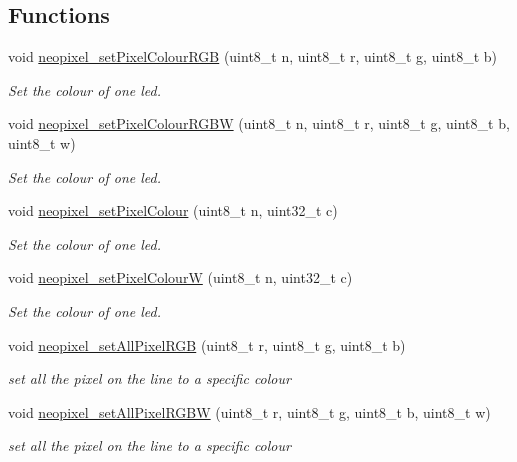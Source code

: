 \subsection*{Functions}
\begin{DoxyCompactItemize}
\item 
void \hyperlink{group___neo_pixel___display_ga63c196a71ffb007411929e41ba5df41d}{neopixel\+\_\+set\+Pixel\+Colour\+R\+GB} (uint8\+\_\+t n, uint8\+\_\+t r, uint8\+\_\+t g, uint8\+\_\+t b)
\begin{DoxyCompactList}\small\item\em Set the colour of one led. \end{DoxyCompactList}\item 
void \hyperlink{group___neo_pixel___display_ga58d5ceb79029ca8dc5dd8b27b65e4f09}{neopixel\+\_\+set\+Pixel\+Colour\+R\+G\+BW} (uint8\+\_\+t n, uint8\+\_\+t r, uint8\+\_\+t g, uint8\+\_\+t b, uint8\+\_\+t w)
\begin{DoxyCompactList}\small\item\em Set the colour of one led. \end{DoxyCompactList}\item 
void \hyperlink{group___neo_pixel___display_gaecbdecac1da356c5fba07058983d9066}{neopixel\+\_\+set\+Pixel\+Colour} (uint8\+\_\+t n, uint32\+\_\+t c)
\begin{DoxyCompactList}\small\item\em Set the colour of one led. \end{DoxyCompactList}\item 
void \hyperlink{group___neo_pixel___display_ga4daf6edfe83394f425ec51f64d92c49c}{neopixel\+\_\+set\+Pixel\+ColourW} (uint8\+\_\+t n, uint32\+\_\+t c)
\begin{DoxyCompactList}\small\item\em Set the colour of one led. \end{DoxyCompactList}\item 
void \hyperlink{group___neo_pixel___display_ga7a6c2dc149e86a788aede1d6aa5262d7}{neopixel\+\_\+set\+All\+Pixel\+R\+GB} (uint8\+\_\+t r, uint8\+\_\+t g, uint8\+\_\+t b)
\begin{DoxyCompactList}\small\item\em set all the pixel on the line to a specific colour \end{DoxyCompactList}\item 
void \hyperlink{group___neo_pixel___display_ga1ba017c1f338ef2c8e4a48acae35d87e}{neopixel\+\_\+set\+All\+Pixel\+R\+G\+BW} (uint8\+\_\+t r, uint8\+\_\+t g, uint8\+\_\+t b, uint8\+\_\+t w)
\begin{DoxyCompactList}\small\item\em set all the pixel on the line to a specific colour \end{DoxyCompactList}\end{DoxyCompactItemize}


